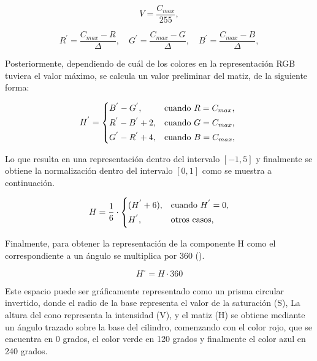 \begin{equation}
V = \frac{C_{max}}{255},
\label{eqn:Value}
\end{equation}

\begin{equation}
R^{'} = \frac{C_{max}-R}{\Delta},  \quad G^{'} = \frac{C_{max}-G}{\Delta},  \quad B^{'} = \frac{C_{max}-B}{\Delta},
\label{eqn:R_prima}
\end{equation}

Posteriormente, dependiendo de cuál de los colores en la representación RGB tuviera el valor máximo, se calcula un valor preliminar del matiz, de la siguiente forma:

\begin{equation}
    H^{'} = \begin{cases*}
  B^{'} - G^{'}, & cuando $R = C_{max}$,\\
  R^{'} - B^{'}+2, & cuando $G = C_{max}$,\\
  G^{'} - R^{'}+4, & cuando $B = C_{max}$,
    \end{cases*}
\label{eqn:H_prima}
\end{equation}

Lo que resulta en una representación dentro del intervalo $[-1,5]$ y finalmente se obtiene la normalización dentro del intervalo $[0,1]$ como se muestra a continuación.

\begin{equation}
    H = \frac{1}{6}\cdot\begin{cases*}
  (H^{'}+6), & cuando $H^{'}=0$,\\
  H^{'}, & otros casos,
    \end{cases*}
    \label{eqn:H_normalizada}
\end{equation}

Finalmente, para obtener la representación de la componente H como el correspondiente a un ángulo se multiplica por 360 (\cite{freire_importancia_2007}).

\begin{equation}
    H^{\circ} = H\cdot360
    \label{eqn:H_degrees}
\end{equation} 

Este espacio puede ser gráficamente representado como un prisma circular invertido, donde el radio de la base representa el valor de la saturación (S), La altura del cono representa la intensidad (V), y el matiz (H) se obtiene mediante un ángulo trazado sobre la base del cilindro, comenzando con el color rojo, que se encuentra en 0 grados, el color verde en 120 grados y finalmente el color azul en 240 grados. 

